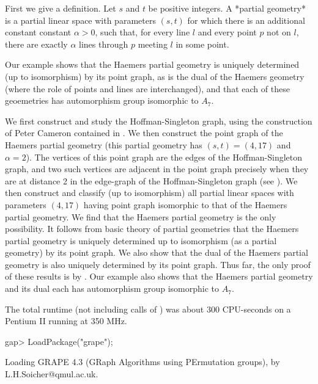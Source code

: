 First we give a definition. Let $s$ and $t$ be positive integers. A
*partial geometry* is a partial linear space with parameters $(s,t)$ for
which there is an additional constant constant $\alpha>0$, such that,
for every line $l$ and every point $p$ not on $l$, there are exactly
$\alpha$ lines through $p$ meeting $l$ in some point. 

Our example shows that the Haemers partial geometry \cite{Hae81}
is uniquely determined (up to isomorphism) by its point graph, as is
the dual of the Haemers geometry (where the role of points and lines
are interchanged), and that each of these geoemetries has automorphism
group isomorphic to $A_7$.

We first construct and study the Hoffman-Singleton graph, using the
construction of Peter Cameron contained in \cite{Cam99}.  We then
construct the point graph of the Haemers partial geometry \cite{Hae81}
(this partial geometry has $(s,t)=(4,17)$ and $\alpha=2$). The vertices
of this point graph are the edges of the Hoffman-Singleton graph, and
two such vertices are adjacent in the point graph precisely when they
are at distance 2 in the edge-graph of the Hoffman-Singleton graph (see
\cite{Hae81}).  We then construct and classify (up to isomorphism)
all partial linear spaces with parameters $(4,17)$ having point graph
isomorphic to that of the Haemers partial geometry. We find that
the Haemers partial geometry is the only possibility. It follows from
basic theory of partial geometries that the Haemers partial geometry is
uniquely determined up to isomorphism (as a partial geometry) by its point
graph. We also show that the dual of the Haemers partial geometry is also
uniquely determined by its point graph. Thus far, the only proof of these
results is by {\GRAPE}. Our example also shows that the Haemers partial
geometry and its dual each has automorphism group isomorphic to $A_7$.

The total runtime (not including calls of {\nauty}) was about 300
CPU-seconds on a Pentium II running at 350 MHz.

\beginexample
gap> LoadPackage("grape");

Loading  GRAPE 4.3  (GRaph Algorithms using PErmutation groups),
by L.H.Soicher@qmul.ac.uk.

